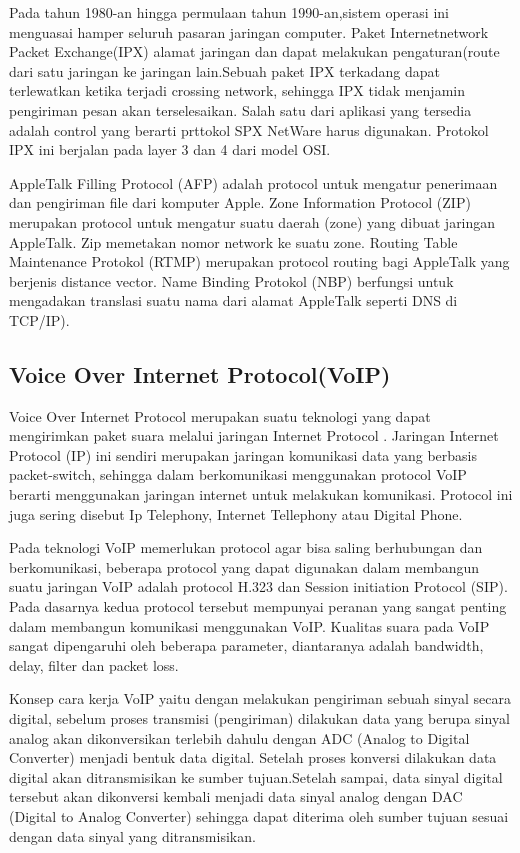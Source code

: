 Pada tahun 1980-an hingga permulaan tahun 1990-an,sistem operasi ini menguasai hamper seluruh pasaran jaringan computer.
Paket Internetnetwork Packet Exchange(IPX) alamat jaringan dan dapat melakukan pengaturan(route dari satu jaringan ke jaringan 
lain.Sebuah paket IPX terkadang dapat terlewatkan ketika terjadi crossing network, sehingga IPX tidak menjamin pengiriman pesan akan 
terselesaikan. Salah satu dari aplikasi yang tersedia adalah control yang berarti prttokol SPX NetWare harus digunakan. Protokol IPX ini 
berjalan pada layer 3 dan 4 dari model OSI.

AppleTalk Filling Protocol (AFP) adalah protocol untuk  mengatur penerimaan dan pengiriman file dari komputer Apple.
Zone Information Protocol (ZIP) merupakan protocol untuk mengatur suatu daerah (zone) yang dibuat jaringan AppleTalk. Zip memetakan 
nomor network ke suatu zone.
Routing Table Maintenance Protokol (RTMP) merupakan protocol routing bagi AppleTalk yang berjenis distance vector.
Name Binding Protokol (NBP) berfungsi untuk mengadakan translasi suatu nama dari alamat AppleTalk seperti DNS di TCP/IP).

\subsection{Voice Over Internet Protocol(VoIP)}
Voice Over Internet Protocol merupakan suatu teknologi yang dapat mengirimkan paket suara melalui jaringan Internet Protocol . Jaringan 
Internet Protocol (IP) ini  sendiri merupakan jaringan komunikasi data yang berbasis packet-switch, sehingga dalam berkomunikasi 
menggunakan protocol VoIP berarti menggunakan jaringan internet untuk melakukan komunikasi. Protocol ini juga sering disebut Ip 
Telephony, Internet Tellephony atau Digital Phone.

Pada teknologi VoIP memerlukan protocol agar bisa saling berhubungan dan berkomunikasi, beberapa protocol yang dapat digunakan dalam 
membangun suatu jaringan VoIP adalah protocol H.323 dan Session initiation Protocol (SIP). Pada dasarnya kedua protocol tersebut 
mempunyai peranan yang sangat penting dalam membangun komunikasi menggunakan VoIP. Kualitas suara pada VoIP sangat dipengaruhi oleh 
beberapa parameter, diantaranya adalah bandwidth, delay, filter dan packet loss.

Konsep cara kerja VoIP yaitu dengan melakukan pengiriman sebuah sinyal secara digital, sebelum proses transmisi (pengiriman) dilakukan 
data yang berupa sinyal analog akan dikonversikan terlebih dahulu dengan ADC (Analog to Digital Converter) menjadi bentuk data digital. 
Setelah proses konversi dilakukan data digital akan ditransmisikan ke sumber tujuan.Setelah sampai, data sinyal digital tersebut akan 
dikonversi kembali menjadi data sinyal analog dengan DAC (Digital to Analog Converter) sehingga dapat diterima oleh sumber tujuan 
sesuai dengan data sinyal yang ditransmisikan.

